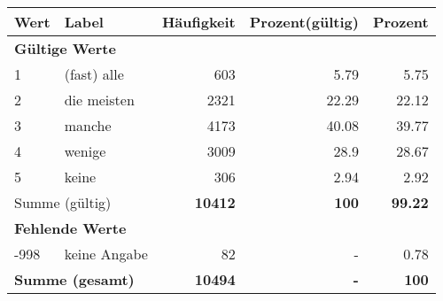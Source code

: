      \begin{longtable}{lXrrr}
     \toprule
     \textbf{Wert} & \textbf{Label} & \textbf{Häufigkeit} & \textbf{Prozent(gültig)} & \textbf{Prozent} \\
     \endhead
     \midrule
     \multicolumn{5}{l}{\textbf{Gültige Werte}}\\

     1 &
     \multicolumn{1}{X}{ (fast) alle   } &


       \num{603} &
       \num[round-mode=places,round-precision=2]{5,79} &
         \num[round-mode=places,round-precision=2]{5,75} \\

     2 &
     \multicolumn{1}{X}{ die meisten   } &


       \num{2321} &
       \num[round-mode=places,round-precision=2]{22,29} &
         \num[round-mode=places,round-precision=2]{22,12} \\

     3 &
     \multicolumn{1}{X}{ manche   } &


       \num{4173} &
       \num[round-mode=places,round-precision=2]{40,08} &
         \num[round-mode=places,round-precision=2]{39,77} \\

     4 &
     \multicolumn{1}{X}{ wenige   } &


       \num{3009} &
       \num[round-mode=places,round-precision=2]{28,9} &
         \num[round-mode=places,round-precision=2]{28,67} \\

     5 &
     \multicolumn{1}{X}{ keine   } &


       \num{306} &
       \num[round-mode=places,round-precision=2]{2,94} &
         \num[round-mode=places,round-precision=2]{2,92} \\
     \midrule
     \multicolumn{2}{l}{Summe (gültig)} &
       \textbf{\num{10412}} &
     \textbf{100} &
       \textbf{\num[round-mode=places,round-precision=2]{99,22}} \\
     \multicolumn{5}{l}{\textbf{Fehlende Werte}}\\
       -998 &
       keine Angabe &
         \num{82} &
        - &
         \num[round-mode=places,round-precision=2]{0,78} \\
     \midrule
     \multicolumn{2}{l}{\textbf{Summe (gesamt)}} &
          \textbf{\num{10494}} &
        \textbf{-} &
        \textbf{100} \\
     \bottomrule
     \end{longtable}
     

